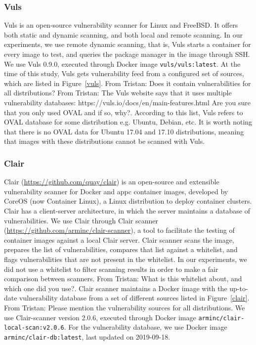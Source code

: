 \documentclass[a4paper,num-refs]{oup-contemporary}
\newcommand{\tristan}[1]{\color{blue}From Tristan: #1\color{black}}
\begin{document}
\subsubsection{Vuls}

Vuls is an open-source vulnerability scanner for Linux and FreeBSD. It
offers both static and dynamic scanning, and both local and remote
scanning. In our experiments, we use remote dynamic scanning, that is, Vuls
starts a container for every image to test, and queries the package manager
in the image through SSH. We use Vuls 0.9.0, executed through Docker image
\texttt{vuls/vuls:latest}. At the time of this study, Vuls gets vulnerability feed
from a configured set of sources, which are listed in Figure~\ref{vuls}.
\tristan{Does it contain
vulnerabilities for all distributions?} 
\tristan{The Vuls website says that it uses multiple vulnerability databases: https://vuls.io/docs/en/main-features.html Are you sure 
that you only used OVAL and if so, why?}. According to this list, Vuls
refers to OVAL database for some distribution e.g. Ubuntu, Debian, etc.
It is worth noting that there is
no OVAL data for Ubuntu 17.04 and 17.10 distributions, meaning that images
with these distributions cannot be scanned with Vuls.

\subsubsection{Clair}

Clair (\url{https://github.com/quay/clair}) is an open-source and extensible
vulnerability scanner for Docker and appc container images, developed by
CoreOS (now Container Linux), a Linux distribution to deploy container
clusters. Clair has a client-server architecture, in which the server
maintains a database of vulnerabilities. We use Clair through Clair scanner
(\url{https://github.com/arminc/clair-scanner}), a tool to facilitate the testing
of container images against a local Clair server. Clair scanner scans the image,
prepares the list of vulnerabilities, compares that list against a
whitelist, and flags vulnerabilities that are not present in the whitelist.
In our experiments, we did not use a whitelist to filter scanning results in
order to make a fair comparison between scanners.
\tristan{What is this whitelist about, and which one did you use?}. Clair
scanner maintains a Docker image with the up-to-date vulnerability
database from a set of different sources listed in Figure~\ref{clair}.  \tristan{Please mention the vulnerability sources for all distributions}.
 We use Clair-scanner version 2.0.6, executed through
Docker image \texttt{arminc/clair-local-scan:v2.0.6}. For the vulnerability
database, we use Docker image \texttt{arminc/clair-db:latest}, last
updated on 2019-09-18.
\end{document}

